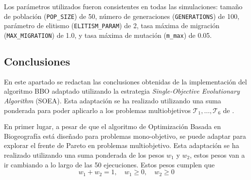 Los parámetros utilizados fueron consistentes en todas las simulaciones: tamaño de población (\verb|POP_SIZE|) de 50, número de generaciones (\verb|GENERATIONS|) de 100, parámetro de elitismo (\verb|ELITISM_PARAM|) de 2, tasa máxima de migración (\verb|MAX_MIGRATION|) de 1.0, y tasa máxima de mutación (\verb|m_max|) de 0.05.


\subsection{Conclusiones}
\label{sec:meta2_Conclusiones}
En este apartado se redactan las conclusiones obtenidas de la implementación del algoritmo BBO adaptado utilizando la estrategia \textit{Single-Objective Evolutionary Algorithm} (SOEA). Esta adaptación se ha realizado utilizando una suma ponderada para poder aplicarlo a los problemas multiobjetivos $\mathcal{T}_1, \ldots, \mathcal{T}_6$ de \cite{zitzler2000comparison}.

En primer lugar, a pesar de que el algoritmo de Optimización Basada en Biogeografía está diseñado para problemas mono-objetivo, se puede adaptar para explorar el frente de Pareto en problemas multiobjetivo. Esta adaptación se ha realizado utilizando una suma ponderada de los pesos $w_1$ y $w_2$, estos pesos van a ir cambiando a lo largo de las 50 ejecuciones. Estos pesos cumplen que $$w_1 + w_2 = 1, \quad w_1 \ge 0, \quad w_2 \ge 0$$\\

